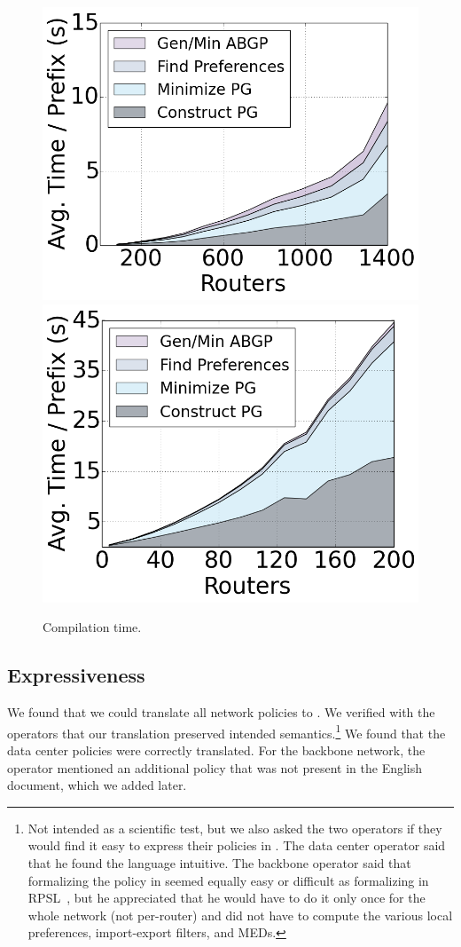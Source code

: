 \begin{figure}
    {\includegraphics[width=.49\columnwidth]{figures/compilation-times-dc.png}}
    {\includegraphics[width=.49\columnwidth]{figures/compilation-times-backbone.png}} \\
  \label{fig:compilation-times}
  \caption{Compilation time.}
\end{figure}

\subsection{Expressiveness}

We found that we could translate all network policies to \sysname. We verified with the operators that our translation preserved intended semantics.\footnote{Not intended as a scientific test, but we also asked the two operators if they would find it easy to express their policies in \sysname. The data center operator said that he found the language intuitive. The backbone operator said that formalizing the policy in \sysname seemed equally easy or difficult as formalizing in RPSL~\cite{x}, but he appreciated that he would have to do it only once for the whole network (not per-router) and did not have to compute the various local preferences, import-export filters, and MEDs.} We found that the data center policies were correctly translated. For the backbone network, the operator mentioned an additional policy that was not present in the English document, which we added later.

